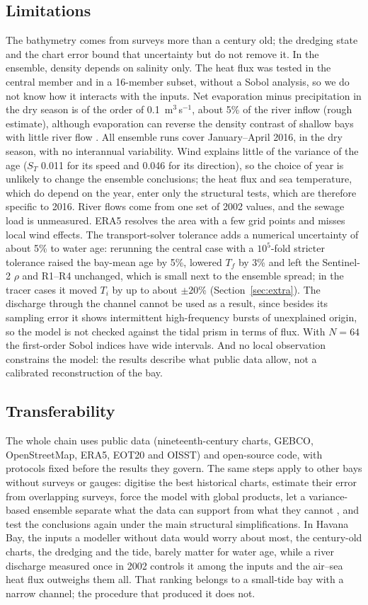 \documentclass[a4paper,fleqn]{ems-dc}
\begin{document}
\subsection{Limitations}
The bathymetry comes from surveys more than a century old; the dredging state and the chart
error bound that uncertainty but do not remove it. In the ensemble, density depends on
salinity only. The heat flux was tested in the central member and in a 16-member subset,
without a Sobol analysis, so we do not know how it interacts with the inputs. Net
evaporation minus precipitation in the dry season is of the order of 0.1~m$^3$\,s$^{-1}$,
about 5\% of the river inflow (rough estimate), although evaporation can reverse the
density contrast of shallow bays with little river flow \citep{Largier1997}. All ensemble
runs cover January--April 2016, in the dry season, with no interannual variability. Wind
explains little of the variance of the age ($S_T$ 0.011 for its speed and 0.046 for its
direction), so the choice of year is unlikely to change the ensemble conclusions; the heat
flux and sea temperature, which do depend on the year, enter only the structural tests,
which are therefore specific to 2016. River flows come from one set of 2002 values, and the
sewage load is unmeasured. ERA5 resolves the area with a few grid points and misses local
wind effects. The transport-solver tolerance adds a numerical uncertainty of about 5\% to
water age: rerunning the central case with a $10^5$-fold stricter tolerance raised the
bay-mean age by 5\%, lowered $T_f$ by 3\% and left the Sentinel-2 $\rho$ and R1--R4
unchanged, which is small next to the ensemble spread; in the tracer cases it moved $T_i$ by
up to about $\pm20$\% (Section~\ref{sec:extra}). The discharge through the channel cannot be
used as a result, since besides its sampling error it shows intermittent high-frequency
bursts of unexplained origin, so the model is not checked against the tidal prism in terms
of flux. With $N = 64$ the first-order Sobol indices have wide intervals. And no local
observation constrains the model: the results describe what public data allow, not a
calibrated reconstruction of the bay.

\subsection{Transferability}
The whole chain uses public data (nineteenth-century charts, GEBCO, OpenStreetMap, ERA5,
EOT20 and OISST) and open-source code, with protocols fixed before the results they govern.
The same steps apply to other bays without surveys or gauges: digitise the best historical
charts, estimate their error from overlapping surveys, force the model with global products,
let a variance-based ensemble separate what the data can support from what they cannot
\citep{Pianosi2016,Razavi2021}, and test the conclusions again under the main structural
simplifications. In Havana Bay, the inputs a modeller without data would worry about most,
the century-old charts, the dredging and the tide, barely matter for water age, while a
river discharge measured once in 2002 controls it among the inputs and the air--sea heat
flux outweighs them all. That ranking belongs to a small-tide bay with a narrow channel; the
procedure that produced it does not.
\end{document}
